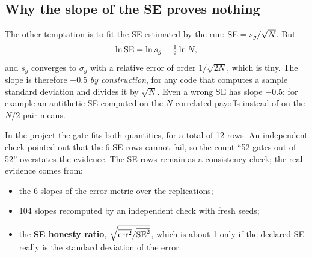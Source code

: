 \subsection{Why the slope of the SE proves nothing}
The other temptation is to fit the SE estimated by the run: $\mathrm{SE}=s_g/\sqrt N$. But
\[
\ln\mathrm{SE}=\ln s_g-\tfrac12\ln N ,
\]
and $s_g$ converges to $\sigma_g$ with a relative error of order $1/\sqrt{2N}$, which is tiny. The slope is therefore
$-0.5$ \emph{by construction}, for any code that computes a sample standard deviation and divides it by $\sqrt N$.
Even a wrong SE has slope $-0.5$: for example an antithetic SE computed on the $N$ correlated payoffs instead of on the
$N/2$ pair means.

\begin{attenzione}[title={A gate that cannot fail is not evidence}]
In the project the gate fits both quantities, for a total of 12 rows. An independent check pointed out that the 6 SE
rows cannot fail, so the count ``52 gates out of 52'' overstates the evidence. The SE rows remain as a consistency
check; the real evidence comes from:
\begin{itemize}
\item the 6 slopes of the error metric over the replications;
\item 104 slopes recomputed by an independent check with fresh seeds;
\item the \textbf{SE honesty ratio}, $\sqrt{\overline{\text{err}^2}/\overline{\mathrm{SE}^2}}$, which is about 1 only if the
declared SE really is the standard deviation of the error.
\end{itemize}
\end{attenzione}

